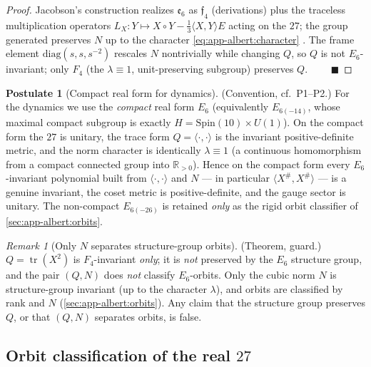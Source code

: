 \documentclass[11pt]{article}
\theoremstyle{plain}
\theoremstyle{definition}
\newtheorem{postulate}[theorem]{Postulate}
\theoremstyle{remark}
\newtheorem{remark}[theorem]{Remark}
\begin{document}
\begin{proof}
Jacobson's construction realizes $\mathfrak e_6$ as $\mathfrak f_4$ (derivations)
plus the traceless multiplication operators
$L_X:Y\mapsto X\circ Y-\tfrac13\langle X,Y\rangle E$ acting on the $27$; the
group generated preserves $N$ up to the character \eqref{eq:app-albert:character}
\cite{Jacobson:1968}. The frame element $\mathrm{diag}(s,s,s^{-2})$ rescales $N$
nontrivially while changing $Q$, so $Q$ is not $E_6$-invariant; only $F_4$
(the $\lambda\equiv1$, unit-preserving subgroup) preserves $Q$. $\qquad
\blacksquare$
\end{proof}

\begin{postulate}[Compact real form for dynamics]\label{post:app-albert:compact}
\textup{(Convention, cf.\ P1--P2.)}
For the dynamics we use the \emph{compact} real form $E_6$ (equivalently
$E_{6(-14)}$, whose maximal compact subgroup is exactly
$H=\mathrm{Spin}(10)\times U(1)$). On the compact form the $27$ is unitary, the
trace form $Q=\langle\cdot,\cdot\rangle$ is the invariant positive-definite
metric, and the norm character is identically $\lambda\equiv1$ (a continuous
homomorphism from a compact connected group into $\mathbb R_{>0}$). Hence on the
compact form every $E_6$-invariant polynomial built from $\langle\cdot,\cdot
\rangle$ and $N$ --- in particular $\langle X^\#,X^\#\rangle$ --- is a genuine
invariant, the coset metric is positive-definite, and the gauge sector is unitary.
The non-compact $E_{6(-26)}$ is retained \emph{only} as the rigid orbit classifier
of \autoref{sec:app-albert:orbits}.
\end{postulate}

\begin{remark}[Only $N$ separates structure-group orbits]\label{rmk:app-albert:onlyN}
\textup{(Theorem, guard.)}
$Q=\operatorname{tr}(X^2)$ is $F_4$-invariant \emph{only}; it is \emph{not}
preserved by the $E_6$ structure group, and the pair $(Q,N)$ does \emph{not}
classify $E_6$-orbits. Only the cubic norm $N$ is structure-group invariant (up to
the character $\lambda$), and orbits are classified by rank and $N$
(\autoref{sec:app-albert:orbits}). Any claim that the structure group preserves
$Q$, or that $(Q,N)$ separates orbits, is false.
\end{remark}

\subsection{Orbit classification of the real \texorpdfstring{$27$}{27}}
\label{sec:app-albert:orbits}
\end{document}
